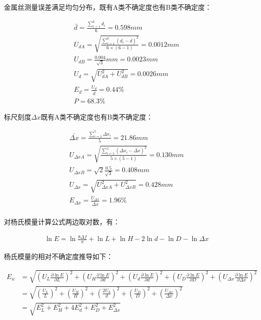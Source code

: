 \documentclass[signature=data]{physicsreport}
\begin{document}
金属丝测量误差满足均匀分布，既有A类不确定度也有B类不确定度：

\begin{gather*}
    \bar d = \frac{\sum_{i=1}^{6}d_i}{6} = 0.598mm\\
    U_{dA} = \sqrt{ \frac{\sum_{i=1}^{6}(d_i - \bar d)^2}{6 \times (6-1)} } = 0.0012mm\\
    U_{dB} = \frac{0.004}{\sqrt 3}mm = 0.0023mm\\
    U_d = \sqrt{U_{dA}^2 + U_{dB}^2} = 0.0026mm\\
    E_d = \frac{U_d}{\bar d} = 0.44\%\\
    P = 68.3\%
\end{gather*}

标尺刻度$\Delta x$既有A类不确定度也有B类不确定度：

\begin{gather*}
    \bar{\Delta x} = \frac{\sum_{i=1}^{5}\Delta x_i}{5} = 21.86mm\\
    U_{\Delta x A} = \sqrt{ \frac{\sum_{i=1}^{5}(\Delta x_i - \bar{\Delta x})^2}{5 \times (5-1)} } = 0.130mm\\
    U_{\Delta x B} = \sqrt{2} \frac{0.5}{\sqrt 3} = 0.408mm\\
    U_{\Delta x} = \sqrt{ U_{\Delta x A}^2 + U_{\Delta x B}^2 } = 0.428mm\\
    E_{\Delta x} = \frac{U_{\Delta x}}{\bar{\Delta x}} = 1.96\%\\
\end{gather*}

对杨氏模量计算公式两边取对数，有：

\begin{gather*}
    \ln E = \ln \frac{8 \Delta f}{\pi} + \ln L + \ln H - 2 \ln d - \ln D - \ln \Delta x
\end{gather*}

杨氏模量的相对不确定度推导如下：

\begin{align*}
    E_u &= \sqrt{(U_L \frac{\partial \ln E}{\partial L})^2 + (U_H \frac{\partial \ln E}{\partial d})^2 + (U_d \frac{\partial \ln E}{\partial d})^2 + (U_D \frac{\partial \ln E}{\partial D})^2 + (U_{\Delta x} \frac{\partial \ln E }{\partial \Delta x})^2} \\
        &= \sqrt{ (\frac{U_L}{L})^2 + (\frac{U_H}{H})^2 + (\frac{2U_d}{d})^2 + (\frac{U_D}{D})^2 + (\frac{U_{\Delta x}}{\Delta x})^2 } \\
        &= \sqrt{ E_L^2 + E_H^2 + 4E_d^2 + E_D^2 + E_{\Delta x}^2 } \
\end{align*}
\end{document}
